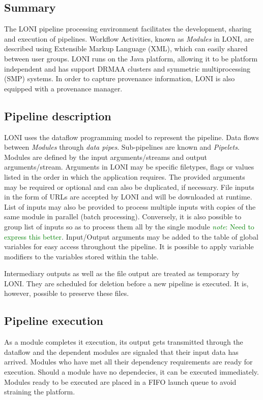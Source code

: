\documentclass{report}
\newcommand{\note}[1]{\textcolor{green}{\textit{note}: #1}}
\begin{document}
        \subsection{Summary}
        The LONI pipeline processing environment facilitates the development,
sharing and execution of pipelines. Workflow Activities, known as \textit{Modules} in
LONI, are described using Extensible Markup Language (XML), which can easily
shared between user groups. LONI runs on the Java platform, allowing it to be
platform independent and has support DRMAA clusters and symmetric
multiprocessing (SMP) systems. In order to
capture provenance information, LONI is also equipped with a provenance manager.
  
        \subsection{Pipeline description}
        LONI uses the dataflow programming model to represent the pipeline. Data
flows between \textit{Modules} through \textit{data pipes}. Sub-pipelines are
known and \textit{Pipelets}. Modules are defined by the input arguments/streams
and output arguments/stream. Arguments in LONI may be specific
filetypes, flags or values listed in the order in which the application
requires. The provided arguments may be required or optional and can also be
duplicated, if necessary. File inputs in the form of URLs are accepted by LONI
and will be downloaded at runtime. List of inputs may also be provided to process
multiple inputs with copies of the same module in parallel (batch processing). Conversely, it is
also possible to group list of inputs so as to process them all by the single
module \note{Need to express this better}. Input/Output arguments may be added
to the table of global variables for easy access throughout the pipeline. It is
possible to apply variable modifiers to the variables stored within the table.

Intermediary outputs as well as the file output are treated as temporary by
LONI. They are scheduled for deletion before a new pipeline is executed. It is,
however, possible to preserve these files. 
  
        \subsection{Pipeline execution}
        As a
module completes it execution, its output gets transmitted through the dataflow
and the dependent modules are signaled that their input data has arrived.
Modules who have met all their dependency requirements are ready for execution.
Should a module have no dependecies, it can be executed immediately. Modules
ready to be executed are placed in a FIFO launch queue to avoid straining the
platform. 
\end{document}

